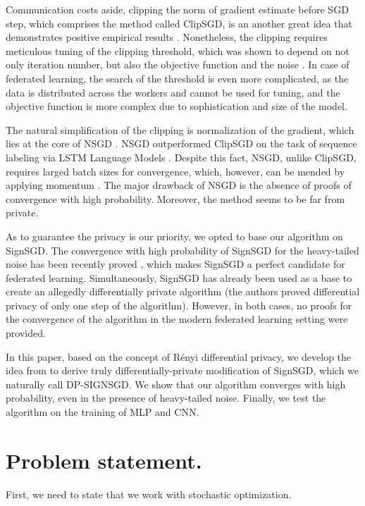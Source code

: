 \documentclass[12pt]{article}
\newcommand{\algname}[1]{{\sf  #1}\xspace}
\begin{document}
Communication costs aside, clipping the norm of gradient estimate before \algname{SGD} step, which comprises the method called \algname{ClipSGD}, is an another great idea that demonstrates positive empirical results \parencite{Pascanu2013, Goodfellow2016}. Nonetheless, the clipping requires meticulous tuning of the clipping threshold, which was shown to depend on not only iteration number, but also the objective function and the noise \parencite[Theorem $3.1$]{Sadiev2023}. In case of federated learning, the search of the threshold is even more complicated, as the data is distributed across the workers and cannot be used for tuning, and the objective function is more complex due to sophistication and size of the model.

The natural simplification of the clipping is normalization of the gradient, which lies at the core of \algname{NSGD} \parencite{Hazan2015}. \algname{NSGD} outperformed \algname{ClipSGD} on the task of sequence labeling via LSTM Language Models \cite{Merity2017}. Despite this fact, \algname{NSGD}, unlike \algname{ClipSGD}, requires larged batch sizes for convergence, which, however, can be mended by applying momentum \cite{Cutkosky2020}. The major drawback of \algname{NSGD} is the absence of proofs of convergence with high probability. Moreover, the method seems to be far from private.

As to guarantee the privacy is our priority, we opted to base our algorithm on \algname{SignSGD}. The convergence with high probability of \algname{SignSGD} for the heavy-tailed noise has been recently proved \parencite{Kornilov2025}, which makes \algname{SignSGD} a perfect candidate for federated learning. Simultaneously, \algname{SignSGD} has already been used as a base to create an allegedly differentially private algorithm \parencite{Jin2020} (the authors proved differential privacy of only one step of the algorithm). However, in both cases, no proofs for the convergence of the algorithm in the modern federated learning setting were provided.

In this paper, based on the concept of Rényi differential privacy, we develop the idea from \cite{Jin2020} to derive truly differentially-private modification of \algname{SignSGD}, which we naturally call {\scriptsize DP-SIGN}SGD. We show that our algorithm converges with high probability, even in the presence of heavy-tailed noise. Finally, we test the algorithm on the training of MLP and CNN.

\section{Problem statement.}
First, we need to state that we work with stochastic optimization.
\end{document}
